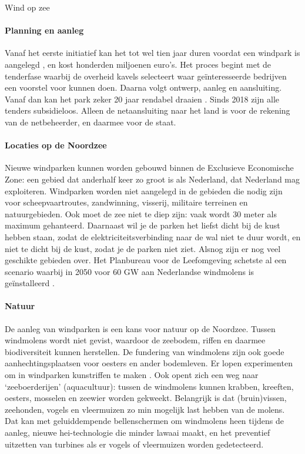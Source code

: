 \begin{voorstel}{Wind op zee}
\begin{overwegingen}
\paragraph{Planning en aanleg}
Vanaf het eerste initiatief kan het tot wel tien jaar duren voordat een windpark is aangelegd \parencite{westra_offshore_2014}, en kost honderden miljoenen euro’s. Het proces begint met de tenderfase waarbij de overheid kavels selecteert waar geïnteresseerde bedrijven een voorstel voor kunnen doen. Daarna volgt ontwerp, aanleg en aansluiting. Vanaf dan kan het park zeker 20 jaar rendabel draaien \parencite{lensink_kosten_2017}. Sinds 2018 zijn alle tenders subsidieloos. Alleen de netaansluiting naar het land is voor de rekening van de netbeheerder, en daarmee voor de staat.

\paragraph{Locaties op de Noordzee}
Nieuwe windparken kunnen worden gebouwd binnen de Exclusieve Economische Zone: een gebied dat anderhalf keer zo groot is als Nederland, dat Nederland mag exploiteren. Windparken worden niet aangelegd in de gebieden die nodig zijn voor scheepvaartroutes, zandwinning, visserij, militaire terreinen en natuurgebieden. Ook moet de zee niet te diep zijn: vaak wordt 30 meter als maximum gehanteerd. Daarnaast wil je de parken het liefst dicht bij de kust hebben staan, zodat de elektriciteitsverbinding naar de wal niet te duur wordt, en niet te dicht bij de kust, zodat je de parken niet ziet. Alsnog zijn er nog veel geschikte gebieden over. Het Planbureau voor de Leefomgeving schetste al een scenario waarbij in 2050 voor 60 GW aan Nederlandse windmolens is geïnstalleerd \parencite{matthijsen_toekomst_2018}.

\paragraph{Natuur}
De aanleg van windparken is een kans voor natuur op de Noordzee. Tussen windmolens wordt niet gevist, waardoor de zeebodem, riffen en daarmee biodiversiteit kunnen herstellen.  De fundering van windmolens zijn ook goede aanhechtingsplaatsen voor oesters en ander bodemleven. Er lopen experimenten om in windparken kunstriffen te maken \parencite{didderen_offshore_2019}. Ook opent zich een weg naar ‘zeeboerderijen’ (aquacultuur): tussen de windmolens kunnen krabben, kreeften, oesters, mosselen en zeewier worden gekweekt.
Belangrijk is dat (bruin)vissen, zeehonden, vogels en vleermuizen zo min mogelijk last hebben van de molens. Dat kan met geluiddempende bellenschermen om windmolens heen tijdens de aanleg, nieuwe hei-technologie die minder lawaai maakt, en het preventief uitzetten van turbines als er vogels of vleermuizen worden gedetecteerd.


\end{overwegingen}
\end{voorstel}
